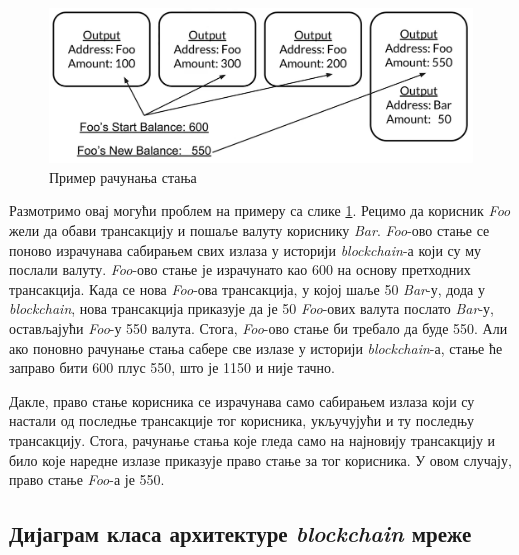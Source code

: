 \documentclass[12pt, a4paper]{article}
\begin{document}
\begin{figure}[h]
    \centering
    \includegraphics[width=1\linewidth]{slike/balance.png}
    \caption{Пример рачунања стања}
    \label{fig:balance}
\end{figure}
\pagebreak
Размотримо овај могући проблем на примеру са слике \ref{fig:balance}. Рецимо да корисник \textit{Foo} жели да обави трансакцију и пошаље валуту кориснику \textit{Bar}. \textit{Foo}-ово стање се поново израчунава сабирањем свих излаза у историји \textit{blockchain}-а који су му послали валуту. \textit{Foo}-ово стање је израчунато као 600 на основу претходних трансакција. Када се нова \textit{Foo}-ова трансакција, у којој шаље 50 \textit{Bar}-у, дода у \textit{blockchain}, нова трансакција приказује да је 50 \textit{Foo}-ових валута послато \textit{Bar}-у, остављајући \textit{Foo}-у 550 валута. Стога, \textit{Foo}-ово стање би требало да буде 550. Али ако поновно рачунање стања сабере све излазе у историји \textit{blockchain}-а, стање ће заправо бити 600 плус 550, што је 1150 и није тачно.

Дакле, право стање корисника се израчунава само сабирањем излаза који су настали од последње трансакције тог корисника, укључујући и ту последњу трансакцију. Стога, рачунање стања које гледа само на најновију трансакцију и било које наредне излазе приказује право стање за тог корисника. У овом случају, право стање \textit{Foo}-а је 550.


\newpage
\subsection{Дијаграм класа архитектуре \textit{blockchain} мреже}
\end{document}
